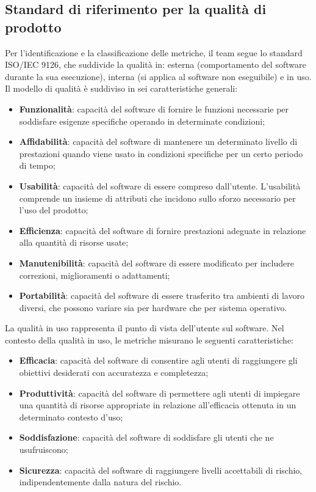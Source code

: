\subsection{Standard di riferimento per la qualità di prodotto}
\par Per l'identificazione e la classificazione delle metriche, il team segue lo standard ISO/IEC 9126, che suddivide la qualità in: esterna (comportamento del software durante la sua esecuzione), interna (si applica al software non eseguibile) e in uso. Il modello di qualità è suddiviso in sei caratteristiche generali:
\begin{itemize}
    \item \textbf{Funzionalità}: capacità del software di fornire le funzioni necessarie per soddisfare esigenze specifiche operando in determinate condizioni;
    \item \textbf{Affidabilità}: capacità del software di mantenere un determinato livello di prestazioni quando viene usato in condizioni specifiche per un certo periodo di tempo;
    \item \textbf{Usabilità}: capacità del software di essere compreso dall'utente. L'usabilità comprende un insieme di attributi che incidono sullo sforzo necessario per l'uso del prodotto;
    \item \textbf{Efficienza}: capacità del software di fornire prestazioni adeguate in relazione alla quantità di risorse usate;
    \item \textbf{Manutenibilità}: capacità del software di essere modificato per includere correzioni, miglioramenti o adattamenti;
    \item \textbf{Portabilità}: capacità del software di essere trasferito tra ambienti di lavoro diversi, che possono variare sia per hardware che per sistema operativo.
\end{itemize}

\vspace{0.5\baselineskip}
\par La qualità in uso rappresenta il punto di vista dell'utente sul software. Nel contesto della qualità in uso, le metriche misurano le seguenti caratteristiche:
\begin{itemize}
    \item \textbf{Efficacia}: capacità del software di consentire agli utenti di raggiungere gli obiettivi desiderati con accuratezza e completezza;
    \item \textbf{Produttività}: capacità del software di permettere agli utenti di impiegare una quantità di risorse appropriate in relazione all'efficacia ottenuta in un determinato contesto d'uso;
    \item \textbf{Soddisfazione}: capacità del software di soddisfare gli utenti che ne usufruiscono;
    \item \textbf{Sicurezza}: capacità del software di raggiungere livelli accettabili di rischio, indipendentemente dalla natura del rischio.
\end{itemize}



